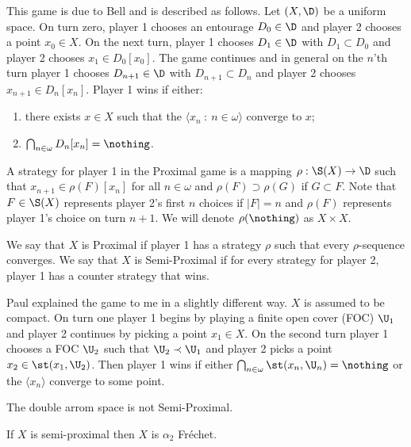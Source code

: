 \documentclass{article}
\begin{document}
This game is due to Bell and is described as follows. Let \((X, \D)\) be a uniform space. On turn zero, player 1 chooses an entourage \(D_0 \in \D\) and player 2 chooses a point \(x_0 \in X\). On the next turn, player 1 chooses \(D_1 \in \D\) with \(D_1 \subset D_0\) and player 2 chooses \(x_1 \in D_0[x_0]\). The game continues and in general on the \(n\)'th turn player 1 chooses \(D_{n + 1} \in \D\) with \(D_{n + 1} \subset D_n\) and player 2 chooses \(x_{n + 1} \in D_n[x_n]\). Player 1 wins if either: 

\begin{enumerate}
    \item there exists \(x \in X\) such that the \(\langle x_n \: : \: n \in \omega\rangle\) converge to \(x\);
    \item \(\bigcap_{n \in \omega}D_n[x_n] = \nothing\).
\end{enumerate}
\begin{defn}
    A strategy for player 1 in the Proximal game is a mapping \(\rho: \S(X) \to \D\) such that \(x_{n + 1} \in \rho(F)[x_n]\) for all \(n \in \omega\) and \(\rho(F) \supset \rho(G)\) if \(G \subset F\). Note that \(F \in \S(X)\) represents player 2's first \(n\) choices if \(|F| = n\) and \(\rho(F)\) represents player 1's choice on turn \(n + 1\). We will denote \(\rho(\nothing)\) as \(X \times X\). 
\end{defn}
\begin{defn}
    We say that \(X\) is Proximal if player 1 has a strategy \(\rho\) such that every \(\rho\)-sequence converges. We say that \(X\) is Semi-Proximal if for every strategy for player 2, player 1 has a counter strategy that wins.
\end{defn}
\begin{rem}
    Paul explained the game to me in a slightly different way. \(X\) is assumed to be compact. On turn one player 1 begins by playing a finite open cover (FOC) \(\U_1\) and player 2 continues by picking a point \(x_1 \in X\). On the second turn player 1 chooses a FOC \(\U_2\) such that \(\U_2 \prec \U_1\) and player 2 picks a point \(x_2 \in \st(x_1, \U_2)\). Then player 1 wins if either \(\bigcap_{n \in \omega}\st(x_n, \U_n) = \nothing\) or the \(\langle x_n \rangle\) converge to some point. 
\end{rem}
\begin{exam}
    The double arrom space is not Semi-Proximal.
\end{exam}
\begin{prop}
    If \(X\) is semi-proximal then \(X\) is \(\alpha_2\) Fréchet. 
\end{prop}
\end{document}
